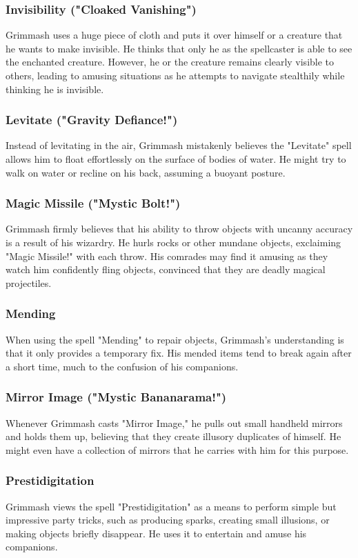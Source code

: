 \documentclass[letterpaper,openany,oneside,twocolumn]{book}
\begin{document}
\subsubsection*{Invisibility ("Cloaked Vanishing")}
Grimmash uses a huge piece of cloth and puts it over himself or a creature that he wants to make invisible. He thinks that only he as the spellcaster is able to see the enchanted creature. However, he or the creature remains clearly visible to others, leading to amusing situations as he attempts to navigate stealthily while thinking he is invisible.
\subsubsection*{Levitate ("Gravity Defiance!")}
Instead of levitating in the air, Grimmash mistakenly believes the "Levitate" spell allows him to float effortlessly on the surface of bodies of water. He might try to walk on water or recline on his back, assuming a buoyant posture.
\subsubsection*{Magic Missile ("Mystic Bolt!")}
Grimmash firmly believes that his ability to throw objects with uncanny accuracy is a result of his wizardry. He hurls rocks or other mundane objects, exclaiming "Magic Missile!" with each throw. His comrades may find it amusing as they watch him confidently fling objects, convinced that they are deadly magical projectiles.
\subsubsection*{Mending}
When using the spell "Mending" to repair objects, Grimmash's understanding is that it only provides a temporary fix. His mended items tend to break again after a short time, much to the confusion of his companions.
\subsubsection*{Mirror Image ("Mystic Bananarama!")}
Whenever Grimmash casts "Mirror Image," he pulls out small handheld mirrors and holds them up, believing that they create illusory duplicates of himself. He might even have a collection of mirrors that he carries with him for this purpose.
\subsubsection*{Prestidigitation}
Grimmash views the spell "Prestidigitation" as a means to perform simple but impressive party tricks, such as producing sparks, creating small illusions, or making objects briefly disappear. He uses it to entertain and amuse his companions.
\end{document}

